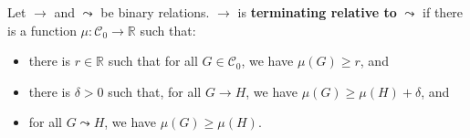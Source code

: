 \begin{proposition}
    \label{abstract_termination_criterion}
    Let \(\to\) and \(\leadsto\) be binary relations. \(\to\) is \textbf{terminating relative to} \(\leadsto\) if there is a function \(\mu : \mathcal{C}_0 \mathop{\to} \mathbb{R}\) such that:
\begin{itemize}
    \item there is $r \mathop{\in} \mathbb{R}$ such that for all \(G \mathop{\in} \mathcal{C}_0\),
    we have \(\mu(G) \mathop{\geq} r\), and
    \item there is $\delta \mathop{>} 0$ such that, for all \(G \mathop{\to} H\), we have \(\mu(G) \mathop{\geq} \mu(H)\mathop{+}\delta\), and
    \item for all \(G \leadsto H\), we have \(\mu(G) \mathop{\geq} \mu(H)\).
\end{itemize}
\end{proposition}